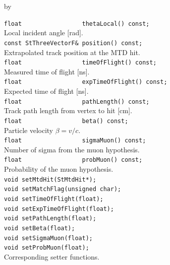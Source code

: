 \documentclass[twoside]{article}
\newcommand{\entrylabel}[1]{\mbox{\textbf{{#1}}}\hfil}%
\newenvironment{entry}
{\begin{list}{}%
    {\renewcommand{\makelabel}{\entrylabel}%
     \setlength{\labelwidth}{90pt}%
     \setlength{\leftmargin}{\labelwidth}
     \advance\leftmargin by \labelsep%
      }%
    }%
  {\end{list}}
\newcommand{\Entrylabel}[1]%
{\raisebox{0pt}[1ex][0pt]{\makebox[\labelwidth][l]%
    {\parbox[t]{\labelwidth}{\hspace{0pt}\textbf{{#1}}}}}}
\newenvironment{Entry}%
{\renewcommand{\entrylabel}{\Entrylabel}\begin{entry}}%
  {\end{entry}}
\begin{document}
\begin{Entry}
    \verb+float                 thetaLocal() const;+\\
    Local incident angle [rad].\\
    \verb+const StThreeVectorF& position() const;+\\
    Extrapolated track position at the MTD hit.\\
    \verb+float                 timeOfFlight() const;+\\
    Measured time of flight [ns].\\
    \verb+float                 expTimeOfFlight() const;+\\
    Expected time of flight [ns].\\
    \verb+float                 pathLength() const;+\\
    Track path length from vertex to hit [cm].\\
    \verb+float                 beta() const;+\\
    Particle velocity $\beta = v/c$.\\
    \verb+float                 sigmaMuon() const;+\\
    Number of sigma from the muon hypothesis.\\
    \verb+float                 probMuon() const;+\\
    Probability of the muon hypothesis.\\
    \verb+void setMtdHit(StMtdHit*);+\\
    \verb+void setMatchFlag(unsigned char);+\\
    \verb+void setTimeOfFlight(float);+\\
    \verb+void setExpTimeOfFlight(float);+\\
    \verb+void setPathLength(float);+\\
    \verb+void setBeta(float);+\\
    \verb+void setSigmaMuon(float);+\\
    \verb+void setProbMuon(float);+\\
    Corresponding setter functions.\\
\end{Entry}
\clearpage

\end{document}
